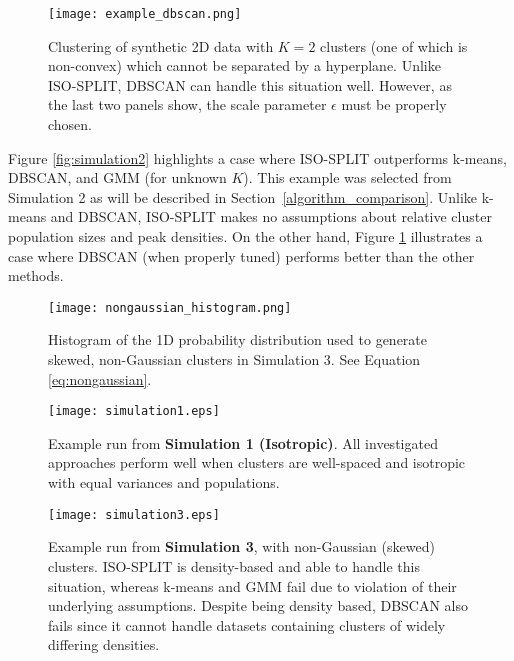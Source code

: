 \documentclass[10pt]{article}
\begin{document}
\begin{figure}
\begin{center}
\texttt{[image: example\_dbscan.png]}
\end{center}
\caption{
Clustering of synthetic 2D data with $K=2$ clusters (one of which is non-convex) which cannot be separated by a hyperplane.
Unlike ISO-SPLIT, DBSCAN can handle this situation well. However, as the last two panels show, the scale parameter $\epsilon$ must be properly chosen.
}
\label{fig:example_dbscan}
\end{figure}

Figure \ref{fig:simulation2} highlights a case where ISO-SPLIT outperforms k-means, DBSCAN, and GMM (for unknown $K$). This example was selected from Simulation 2 as will be described in Section~\ref{algorithm_comparison}. Unlike k-means and DBSCAN, ISO-SPLIT makes no assumptions about relative cluster population sizes and peak densities. On the other hand, Figure \ref{fig:example_dbscan} illustrates a case where DBSCAN (when properly tuned) performs better than the other methods.

\begin{figure}
\begin{center}
\texttt{[image: nongaussian\_histogram.png]}
\end{center}
\caption{
Histogram of the 1D probability distribution used to generate skewed, non-Gaussian clusters in Simulation 3. See Equation \eqref{eq:nongaussian}.
}
\label{fig:nongaussian_histogram}
\end{figure}

\begin{figure}
\begin{center}
\texttt{[image: simulation1.eps]}
\end{center}
\caption{
Example run from \textbf{Simulation 1 (Isotropic)}. All investigated approaches perform well when clusters are well-spaced and isotropic with equal variances and populations.
}
\label{fig:simulation1}
\end{figure}

\begin{figure}
\begin{center}
\texttt{[image: simulation3.eps]}
\end{center}
\caption{
Example run from \textbf{Simulation 3}, with non-Gaussian (skewed) clusters. ISO-SPLIT is density-based and able to handle this situation, whereas k-means and GMM fail due to violation of their underlying assumptions. Despite being density based, DBSCAN also fails since it cannot handle datasets containing clusters of widely differing densities.
}
\label{fig:simulation3}
\end{figure}
\end{document}
